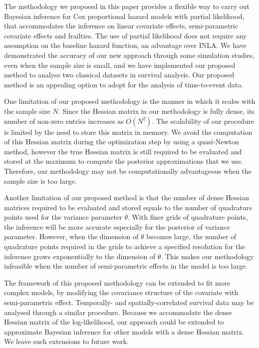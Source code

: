 \documentclass[ba]{imsart}
\begin{document}
The methodology we proposed in this paper provides a flexible way to carry out Bayesian inference for Cox proportional hazard models with partial likelihood, that accommodates the inference on linear covariate effects, semi-parametric covariate effects and frailties. The use of partial likelihood does not require any assumption on the baseline hazard function, an advantage over INLA. We have demonstrated the accuracy of our new approach through some simulation studies, even when the sample size is small, and we have implemented our proposed method to analyse two classical datasets in survival analysis. Our proposed method is an appealing option to adopt for the analysis of time-to-event data.

One limitation of our proposed methodology is the manner in which it scales with the sample size $N$. Since the Hessian matrix in our methodology is fully dense, its number of non-zero entries increases as $O(N^{2})$. The scalability of our procedure is limited by the need to store this matrix in memory. We avoid the computation of this Hessian matrix during the optimization step by using a quasi-Newton method, however the true Hessian matrix is still required to be evaluated and stored at the maximum to compute the posterior approximations that we use. Therefore, our methodology may not be computationally advantageous when the sample size is too large.

Another limitation of our proposed method is that the number of dense Hessian matrices required to be evaluated and stored equals to the number of quadrature points used for the variance parameter $\theta$. With finer grids of quadrature points, the inference will be more accurate especially for the posterior of variance parameter. However, when the dimension of $\theta$ becomes large, the number of quadrature points required in the grids to achieve a specified resolution for the inference grows exponentially to the dimension of $\theta$. This makes our methodology infeasible when the number of semi-parametric effects in the model is too large.


The framework of this proposed methodology can be extended to fit more complex models, by modifying the covariance structure of the covariate with semi-parametric effect. Temporally- and spatially-correlated survival data may be analysed through a similar procedure. Because we accommodate the dense Hessian matrix of the log-likelihood, our approach could be extended to approximate Bayesian inference for other models with a dense Hessian matrix. We leave such extensions to future work.
\end{document}
